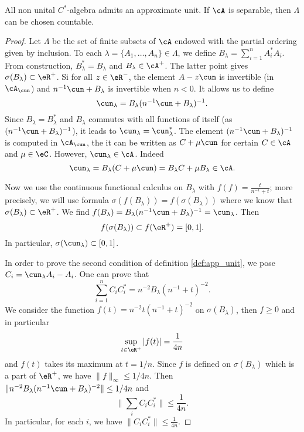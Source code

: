 \begin{proposition}
All non unital $C^*$-algebra admits an approximate unit. If $\cA$ is separable, then $\Lambda$ can be chosen countable.
\end{proposition}

\begin{proof}
Let $\Lambda$ be the set of finite subsets of $\cA$ endowed with the partial ordering given by inclusion. To each $\lambda=\{ A_1,\ldots,A_n \}\in\Lambda$, we define $B_{\lambda}=\sum_{i=1}^nA_i^*A_i$. From construction, $B_{\lambda}^*=B_{\lambda}$ and $B_{\lambda}\in\cA^+$. The latter point gives $\sigma(B_{\lambda})\subset\eR^+$. Si for all $z\in\eR^-$, the element $A-z\cun$ is invertible (in $\cA_{\cun}$) and $n^{-1}\cun+B_{\lambda}$ is invertible when $n<0$. It allows us to define 
\[ 
  \cun_{\lambda}=B_{\lambda}(n^{-1}\cun+B_{\lambda})^{-1}.
\]
Since $B_{\lambda}=B_{\lambda}^*$ and $B_{\lambda}$ commutes with all functions of itself (as $(n^{-1}\cun+B_{\lambda})^{-1}$), it leads to $\cun_{\lambda}=\cun_{\lambda}^*$. The element $(n^{-1}\cun+B_{\lambda})^{-1}$ is computed in $\cA_{\cun}$, the it can be written as $C+\mu\cun$ for certain $C\in\cA$ and $\mu\in\eC$. However, $\cun_{\lambda}\in\cA$. Indeed
\[ 
  \cun_{\lambda}=B_{\lambda}(C+\mu\cun)=B_{\lambda}C+\mu B_{\lambda}\in\cA.
\]

Now we use the continuous functional calculus on $B_{\lambda}$ with $f(f)=\frac{t}{n^{-1}+t}$; more precisely, we will use formula $\sigma(f(B_{\lambda}))=f(\sigma(B_{\lambda}))$ where we know that $\sigma(B_{\lambda})\subset\eR^+$. We find $f(B_{\lambda})=B_{\lambda}(n^{-1}\cun+B_{\lambda})^{-1}=\cun_{\lambda}$. Then
\[ 
  f(\sigma(B_{\lambda}))\subset f(\eR^+)=[0,1].
\]
In particular, $\sigma(\cun_{\lambda})\subset[0,1]$. 

In order to prove the second condition of definition \ref{def:app_unit}, we pose $C_i=\cun_{\lambda} A_i-A_i$. One can prove that 
\[ 
  \sum_{i=1}^n C_iC_i^*=n^{-2}B_{\lambda}(n^{-1}+t)^{-2}.
\]
 We consider the function $f(t)=n^{-2}t(n^{-1}+t)^{-2}$ on $\sigma(B_{\lambda})$, then $f\geq 0$ and in particular
\[ 
  \sup_{t\in\eR^+}| f(t) |=\frac{1}{4n}
\]
and $f(t)$ takes its maximum at $t=1/n$. Since $f$ is defined on $\sigma(B_{\lambda})$ which is a part of $\eR^+$, we have $\| f \|_{\infty}\leq 1/4n$. Then $\| n^{-2}B_{\lambda}(n^{-1}\cun+B_{\lambda})^{-2} \|\leq 1/4n$ and
\[ 
  \| \sum_i C_iC_i^* \|\leq\frac{1}{4n}.
\]
In particular, for each $i$, we have $\| C_iC_i^* \|\leq \frac{1}{4n}$.


\end{proof}
